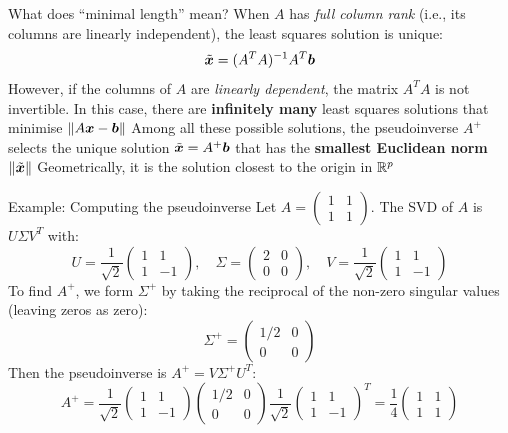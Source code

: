 \documentclass[aspectratio=169]{beamer}\usepackage[]{graphicx}\usepackage[]{xcolor}
\begin{document}
\begin{frame}{What does ``minimal length'' mean?}
When $A$ has \emph{full column rank} (i.e., its columns are linearly independent), the least squares solution is unique:
\[
\tilde{\bm{x}} = (A^T A)^{-1} A^T \bm{b}
\]
However, if the columns of $A$ are \emph{linearly dependent}, the matrix $A^T A$ is not invertible. In this case, there are \textbf{infinitely many} least squares solutions that minimise $\|A\bm{x} - \bm{b}\|$ 
\vfill
Among all these possible solutions, the pseudoinverse $A^+$ selects the unique solution $\tilde{\bm{x}} = A^+\bm{b}$ that has the \textbf{smallest Euclidean norm} $\|\tilde{\bm{x}}\|$
\vfill
Geometrically, it is the solution closest to the origin in $\mathbb{R}^p$
\end{frame}

\begin{frame}{Example: Computing the pseudoinverse}
Let $A = \begin{pmatrix} 1 & 1 \\ 1 & 1 \end{pmatrix}$. The SVD of $A$ is $U\Sigma V^T$ with:
\[
U = \frac{1}{\sqrt{2}}\begin{pmatrix} 1 & 1 \\ 1 & -1 \end{pmatrix},\quad
\Sigma = \begin{pmatrix} 2 & 0 \\ 0 & 0 \end{pmatrix},\quad
V = \frac{1}{\sqrt{2}}\begin{pmatrix} 1 & 1 \\ 1 & -1 \end{pmatrix}
\]
\vfill
To find $A^+$, we form $\Sigma^+$ by taking the reciprocal of the non-zero singular values (leaving zeros as zero):
\[
\Sigma^+ = \begin{pmatrix} 1/2 & 0 \\ 0 & 0 \end{pmatrix}
\]
\vfill
Then the pseudoinverse is $A^+ = V\Sigma^+ U^T$:
\[
A^+ = \frac{1}{\sqrt{2}}\begin{pmatrix} 1 & 1 \\ 1 & -1 \end{pmatrix} \begin{pmatrix} 1/2 & 0 \\ 0 & 0 \end{pmatrix} \frac{1}{\sqrt{2}}\begin{pmatrix} 1 & 1 \\ 1 & -1 \end{pmatrix}^T = \frac{1}{4}\begin{pmatrix} 1 & 1 \\ 1 & 1 \end{pmatrix}
\]
\end{frame}
\end{document}
